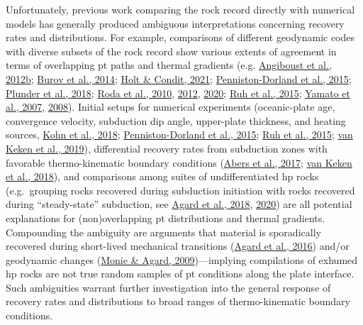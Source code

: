 Unfortunately, previous work comparing the rock record directly with numerical models has generally produced ambiguous interpretations concerning recovery rates and distributions. For example, comparisons of different geodynamic codes with diverse subsets of the rock record show various extents of agreement in terms of overlapping \gls{pt} paths and thermal gradients (e.g. \protect\hyperlink{ref-angiboust2012b}{Angiboust et al., 2012b}; \protect\hyperlink{ref-burov2014}{Burov et al., 2014}; \protect\hyperlink{ref-holt2021}{Holt \& Condit, 2021}; \protect\hyperlink{ref-penniston2015}{Penniston-Dorland et al., 2015}; \protect\hyperlink{ref-plunder2018}{Plunder et al., 2018}; \protect\hyperlink{ref-roda2010}{Roda et al., 2010}, \protect\hyperlink{ref-roda2012}{2012}, \protect\hyperlink{ref-roda2020}{2020}; \protect\hyperlink{ref-ruh2015}{Ruh et al., 2015}; \protect\hyperlink{ref-yamato2007}{Yamato et al., 2007}, \protect\hyperlink{ref-yamato2008}{2008}). Initial setups for numerical experiments (oceanic-plate age, convergence velocity, subduction dip angle, upper-plate thickness, and heating sources, \protect\hyperlink{ref-kohn2018}{Kohn et al., 2018}; \protect\hyperlink{ref-penniston2015}{Penniston-Dorland et al., 2015}; \protect\hyperlink{ref-ruh2015}{Ruh et al., 2015}; \protect\hyperlink{ref-vankeken2019}{van Keken et al., 2019}), differential recovery rates from subduction zones with favorable thermo-kinematic boundary conditions (\protect\hyperlink{ref-abers2017}{Abers et al., 2017}; \protect\hyperlink{ref-vankeken2018}{van Keken et al., 2018}), and comparisons among suites of undifferentiated \gls{hp} rocks (e.g.~grouping rocks recovered during subduction initiation with rocks recovered during ``steady-state'' subduction, see \protect\hyperlink{ref-agard2018}{Agard et al., 2018}, \protect\hyperlink{ref-agard2020}{2020}) are all potential explanations for (non)overlapping \gls{pt} distributions and thermal gradients. Compounding the ambiguity are arguments that material is sporadically recovered during short-lived mechanical transitions (\protect\hyperlink{ref-agard2016}{Agard et al., 2016}) and/or geodynamic changes (\protect\hyperlink{ref-monie2009}{Monie \& Agard, 2009})---implying compilations of exhumed \gls{hp} rocks are not true random samples of \gls{pt} conditions along the plate interface. Such ambiguities warrant further investigation into the general response of recovery rates and distributions to broad ranges of thermo-kinematic boundary conditions.

